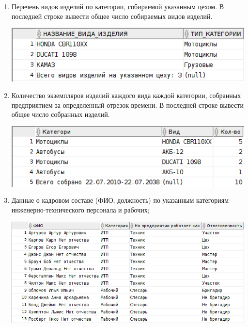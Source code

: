\begin{enumerate}

    \item Перечень видов изделий по категории, собираемой указанным цехом.
    В последней строке вывести общее число собираемых видов изделий.

    

    \includegraphics[width=16cm]{./screenshots/results/result1.png}

    \item Количество экземпляров изделий каждого вида каждой категории, собранных предприятием за определенный отрезок времени.
    В последней строке вывести общее число собранных изделий.

    

    \includegraphics[width=16cm]{./screenshots/results/result2.png}

    \item Данные о кадровом составе (ФИО, должность) по указанным категориям инженерно-технического персонала и рабочих;

    

    \includegraphics[width=16cm]{./screenshots/results/result3.png}


\end{enumerate}

